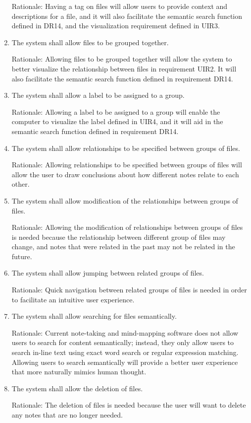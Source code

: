 \documentclass{article}
\begin{document}
\begin{enumerate}[DR1]
	Rationale: Having a tag on files will allow users to provide context and descriptions for a file, and it will also facilitate the semantic search function defined in DR14, and the visualization requirement defined in UIR3.
    \item The system shall allow files to be grouped together.

	Rationale: Allowing files to be grouped together will allow the system to better visualize the relationship between files in requirement UIR2. It will also facilitate the semantic search function defined in requirement DR14.
    \item The system shall allow a label to be assigned to a group.

	Rationale: Allowing a label to be assigned to a group will enable the computer to visualize the label defined in UIR4, and it will aid in the semantic search function defined in requirement DR14.
    \item The system shall allow relationships to be specified between groups of files.

	Rationale: Allowing relationships to be specified between groups of files will allow the user to draw conclusions about how different notes relate to each other.
    \item The system shall allow modification of the relationships between groups of files.

	Rationale: Allowing the modification of relationships between groups of files is needed because the relationship between different group of files may change, and notes that were related in the past may not be related in the future.
    \item The system shall allow jumping between related groups of files.

	Rationale: Quick navigation between related groups of files is needed in order to facilitate an intuitive user experience.
    \item The system shall allow searching for files semantically.

	Rationale: Current note-taking and mind-mapping software does not allow users to search for content semantically; instead, they only allow users to search in-line text using exact word search or regular expression matching. Allowing users to search semantically will provide a better user experience that more naturally mimics human thought.
    \item The system shall allow the deletion of files.
	
	Rationale: The deletion of files is needed because the user will want to delete any notes that are no longer needed.
\end{enumerate}
\end{document}
